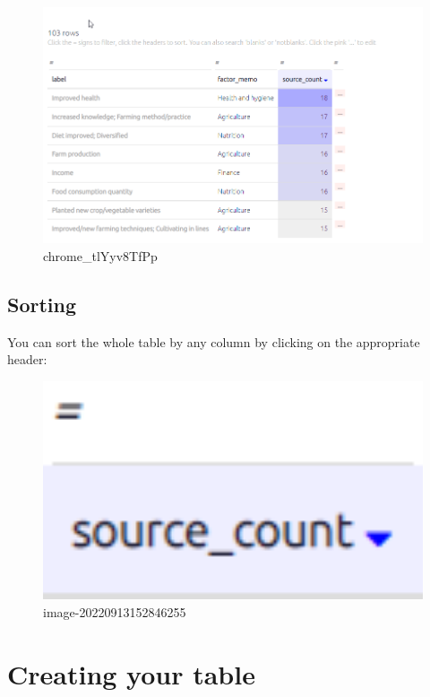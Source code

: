 \documentclass[
]{book}
\begin{document}
\begin{figure}
\centering
\includegraphics[width=6.77083in,height=\textheight]{_assets/chrome_tlYyv8TfPp.gif}
\caption{chrome\_tlYyv8TfPp}
\end{figure}

\hypertarget{sorting-1}{%
\subsection{Sorting}\label{sorting-1}}

You can sort the whole table by any column by clicking on the appropriate header:

\begin{figure}
\centering
\includegraphics[width=6.77083in,height=\textheight]{_assets/image-20220913152846255.png}
\caption{image-20220913152846255}
\end{figure}

\hypertarget{creating-your-table}{%
\section{Creating your table}\label{creating-your-table}}
\end{document}
